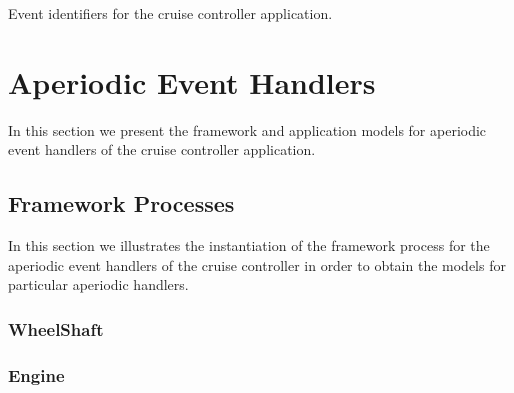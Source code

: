 \documentclass{article}
\begin{document}
Event identifiers for the cruise controller application.
%
\begin{circusbox}

\end{circusbox}

\newpage


\section{Aperiodic Event Handlers}

In this section we present the framework and application models for aperiodic event handlers of the cruise controller application.


%

\subsection{Framework Processes}

In this section we illustrates the instantiation of the framework process for the aperiodic event handlers of the cruise controller in order to obtain the models for particular aperiodic handlers.

\subsubsection{WheelShaft}

\begin{circusbox}

\end{circusbox}

\subsubsection{Engine}

\begin{circusbox}

\end{circusbox}
\end{document}
